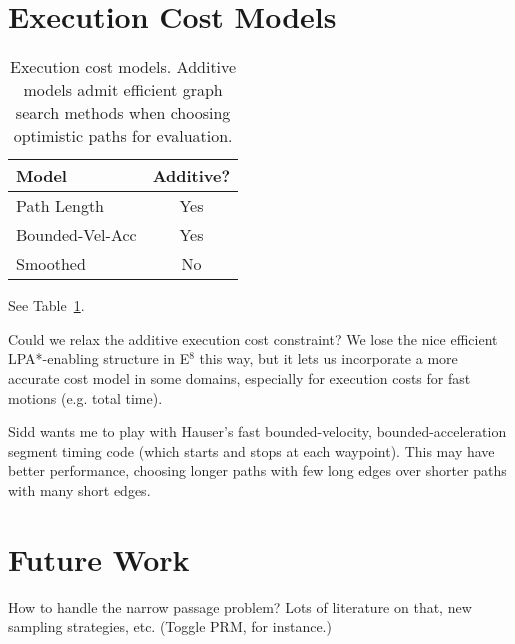 \section{Execution Cost Models}

\begin{table}
   \centering
   \begin{tabular}{lc}
      \toprule
      Model & Additive? \\
      \midrule
      Path Length & Yes \\
      Bounded-Vel-Acc & Yes \\
      Smoothed & No \\
      \bottomrule
   \end{tabular}
   \caption{Execution cost models.
      Additive models admit efficient graph search methods
      when choosing optimistic paths for evaluation.}
   \label{table:exec-cost-models}
\end{table}

See Table~\ref{table:exec-cost-models}.

Could we relax the additive execution cost constraint?
We lose the nice efficient LPA*-enabling structure in
E$^8$ this way,
but it lets us incorporate a more accurate cost model in some domains,
especially for execution costs for fast motions (e.g. total time).

Sidd wants me to play with Hauser's fast bounded-velocity,
bounded-acceleration segment timing code
(which starts and stops at each waypoint).
This may have better performance,
choosing longer paths with few long edges over
shorter paths with many short edges.

\section{Future Work}

How to handle the narrow passage problem?
Lots of literature on that, new sampling strategies, etc.
(Toggle PRM, for instance.)
